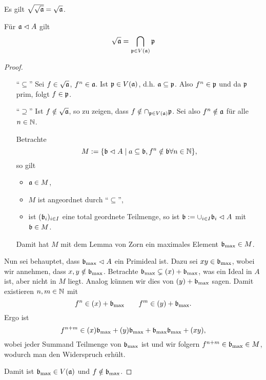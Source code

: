 \begin{bemerkung}
	Es gilt $\sqrt{\sqrt {\mathfrak{a}}} = \sqrt{\mathfrak{a}}$.
\end{bemerkung}

\begin{lemma}
	\label{lemma:radikal ist schnitt}
	Für $\mathfrak{a} \vartriangleleft A$ gilt
	\[
		\sqrt{\mathfrak{a}} = \bigcap_{\mathfrak{p}\in V(\mathfrak{a})} \mathfrak{p}
	\]
\end{lemma}
\begin{proof}
	  \newcommand{\bmax}{\b_\text{max}}
	\begin{itemize}
	  \item["`$\subseteq$"']
	  	Sei $f \in \sqrt{\mathfrak{a}}$, $f^n \in \mathfrak{a}$. Ist $\mathfrak{p} \in V(\mathfrak{a})$, d.h.
	  	$\mathfrak{a} \subseteq\mathfrak{p}$. Also
	  	$f^n \in \mathfrak{p}$ und da $\mathfrak{p}$ prim, folgt $f\in \mathfrak{p}$.
	  \item["`$\supseteq$"']
	  	Ist $f\notin \sqrt{\mathfrak{a}}$, so zu zeigen, dass 
	  	$f \notin \cap_{\mathfrak{p}\in V(\mathfrak{a})} \mathfrak{p}$.
	  	Sei also 
	  	$f^n \notin \mathfrak{a}$ für alle $n\in \mathbb{N}$.
	  	
	  	Betrachte
	  	\[ M := \{\mathfrak{b} \vartriangleleft A\mid a\subseteq \mathfrak{b},
	  		f^n \notin \mathfrak{b} \forall n\in \mathbb{N}\},
	  	\]
	  	so gilt
	  	\begin{itemize}
	  	  \item $\mathfrak{a} \in M$,
	  	  \item $M$ ist angeordnet durch "`$\subseteq$"',
	  	  \item ist $(\mathfrak{b}_i)_{i\in I}$ eine total geordnete Teilmenge,
	  	  	so ist $\mathfrak{b}:= \cup_{i\in I} \mathfrak{b}_i \vartriangleleft A$ mit $\mathfrak{b} \in M$.
	  	\end{itemize}
	  	Damit hat $M$ mit dem Lemma von Zorn ein maximales Element
	  	$\bmax \in M$.
	\end{itemize}
	Nun sei behauptet, dass $\bmax \ideal A$ ein Primideal ist.
	Dazu sei $xy \in \bmax$, wobei wir annehmen, dass 
	$x,y \notin \bmax$.
	Betrachte
	$\bmax \subsetneq (x) + \bmax$, was ein Ideal in $A$ ist, aber nicht 
	in $M$ liegt. Analog künnen wir dies von $(y) + \bmax$ sagen. Damit
	existieren $n,m \in \mathbb{N}$ mit
	\[
		f^n \in (x) + \bmax
		\qquad
		f^m \in (y) + \bmax.
	\]
	Ergo ist
	\[
		f^{n+m} \in
			(x)\bmax + (y)\bmax + \bmax\bmax + (xy),
	\]
	wobei jeder Summand Teilmenge von $\bmax$ ist und wir folgern
	$f^{n+m} \in \bmax \in M$, wodurch man den Widerspruch erhült.
	
	Damit ist $\bmax \in V(\a)$ und $f\notin \bmax$. 
\end{proof}

